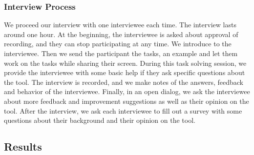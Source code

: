 \subsubsection{Interview Process}
We proceed our interview with one interviewee each time.
The interview lasts around one hour.
At the beginning, the interviewee is asked about approval of recording, and they can stop participating at any time.
We introduce \toolname{} to the interviewee.
Then we send the participant the tasks, an example \cfgfile{} and let them work on the tasks while sharing their screen.
During this task solving session, we provide the interviewee with some basic help if they ask specific questions about the tool.
The interview is recorded, and we make notes of the answers, feedback and behavior of the interviewee.
Finally, in an open dialog, we ask the interviewee about more feedback and improvement suggestions as well as their opinion on the tool.
After the interview, we ask each interviewee to fill out a survey with some questions about their background and their opinion on the tool.

\subsection{Results}\label{subsec:results}

